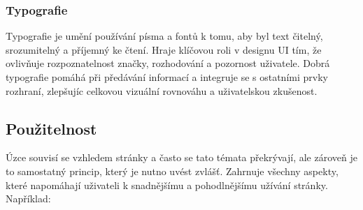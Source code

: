 
\subsubsection{Typografie}
Typografie je umění používání písma a fontů k tomu, aby byl text čitelný, srozumitelný a příjemný ke čtení. Hraje klíčovou roli v designu UI tím, že ovlivňuje rozpoznatelnost značky, rozhodování a pozornost uživatele. Dobrá typografie pomáhá při předávání informací a integruje se s ostatními prvky rozhraní, zlepšujíc celkovou vizuální rovnováhu a uživatelskou zkušenost.

\subsection{Použitelnost}
Úzce souvisí se vzhledem stránky a často se tato témata překrývají, ale zároveň je to samostatný princip, který je nutno uvést zvlášť. Zahrnuje všechny aspekty, které napomáhají uživateli k snadnějšímu a pohodlnějšímu užívání stránky. Například:

